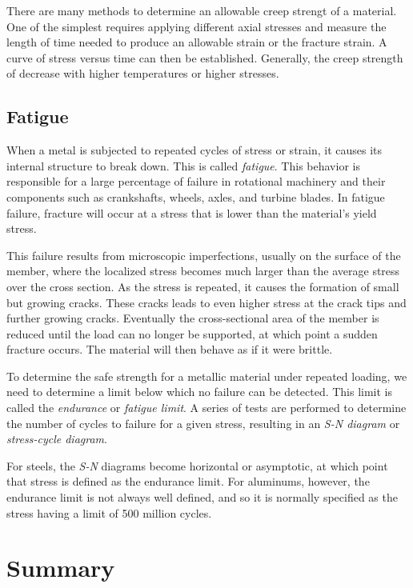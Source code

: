 \documentclass[
10pt,
a4paper,
openany,
svgnames,
]{kaobook} %
\begin{document}
There are many methods to determine an allowable creep strengt of a material. One of the simplest requires applying different axial stresses and measure the length of time needed to produce an allowable strain or the fracture strain. A curve of stress versus time can then be established. Generally, the creep strength of decrease with higher temperatures or higher stresses.


\subsection{Fatigue}

When a metal is subjected to repeated cycles of stress or strain, it causes its internal structure to break down. This is called \emph{fatigue}. This behavior is responsible for a large percentage of failure in rotational machinery and their components such as crankshafts, wheels, axles, and turbine blades. In fatigue failure, fracture will occur at a stress that is lower than the material's yield stress.

This failure results from microscopic imperfections, usually on the surface of the member, where the localized stress becomes much larger than the average stress over the cross section. As the stress is repeated, it causes the formation of small but growing cracks. These cracks leads to even higher stress at the crack tips and further growing cracks. Eventually the cross-sectional area of the member is reduced until the load can no longer be supported, at which point a sudden fracture occurs. The material will then behave as if it were brittle.

To determine the safe strength for a metallic material under repeated loading, we need to determine a limit below which no failure can be detected. This limit is called the \emph{endurance} or \emph{fatigue limit}. A series of tests are performed to determine the number of cycles to failure for a given stress, resulting in an \emph{S-N diagram} or \emph{stress-cycle diagram}.

For steels, the \emph{S-N} diagrams become horizontal or asymptotic, at which point that stress is defined as the endurance limit. For aluminums, however, the endurance limit is not always well defined, and so it is normally specified as the stress having a limit of 500 million cycles. \cite{hibbeler2013}

\section*{Summary}
\end{document}
